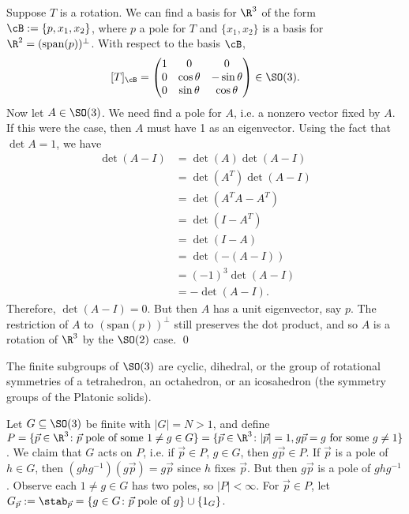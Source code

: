\pf Suppose $T$ is a rotation. We can find a basis for $\R^3$ of the form $\cB:=\{p,x_1,x_2\}$, where $p$ a pole for $T$ and $\{x_1, x_2\}$ is a basis for $\R^2= (\text{span}(p))^\perp$. With respect to the basis $\cB$, 
	\[
	[T]_\cB= 
	\begin{pmatrix}
	1 & 0 & 0 \\
	0 & \cos \theta & -\sin \theta \\
	0 & \sin \theta & \cos \theta
	\end{pmatrix} \in \SO(3).
	\]
Now let $A \in \SO(3)$. We need find a pole for $A$, i.e. a nonzero vector fixed by $A$. If this were the case, then $A$ must have 1 as an eigenvector. Using the fact that $\det A=1$, we have
	\[
	\begin{split}
	\det(A-I)&= \det(A)\det(A-I) \\
	&=\det(A^T)\det(A-I) \\
	&= \det(A^TA-A^T) \\
	&=\det(I-A^T) \\
	&=\det(I-A) \\
	&= \det(-(A-I)) \\
	&= (-1)^3 \det(A-I) \\
	&= - \det(A-I).
	\end{split}
	\]
Therefore, $\det(A-I)=0$. But then $A$ has a unit eigenvector, say $p$. The restriction of $A$ to $(\text{span}(p))^\perp$ still preserves the dot product, and so $A$ is a rotation of $\R^3$ by the $\SO(2)$ case. \qed \\


\begin{thm}
The finite subgroups of $\SO(3)$ are cyclic, dihedral, or the group of rotational symmetries of a tetrahedron, an octahedron, or an icosahedron (the symmetry groups of the Platonic solids).
\end{thm}

\pf Let $G \subseteq \SO(3)$ be finite with $|G|=N>1$, and define $P=\{\vec{p} \in \R^3 \colon \vec{p} \text{ pole of some }1\neq g \in G\}= \{ \vec{p} \in \R^3 \colon |\vec{p}|=1, g\vec{p}=g \text{ for some }g\neq 1\}$. We claim that $G$ acts on $P$, i.e. if $\vec{p} \in P$, $g \in G$, then $g\vec{p} \in P$. If $\vec{p}$ is a pole of $h \in G$, then $(ghg^{-1})(g\vec{p})=g\vec{p}$ since $h$ fixes $\vec{p}$. But then $g\vec{p}$ is a pole of $ghg^{-1}$. Observe each $1 \neq g \in G$ has two poles, so $|P|<\infty$. For $\vec{p} \in P$, let $G_{\vec{p}}:= \stab_{\vec{p}}=\{g \in G \colon \vec{p} \text{ pole of }g\} \cup \{1_G\}$. 

